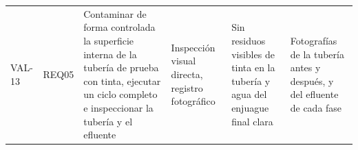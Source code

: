 \begin{longtable}{p{1.3cm} p{1.4cm} p{4.3cm} p{2.6cm} p{3.4cm} p{2.4cm}}
VAL-13 & REQ05 & Contaminar de forma controlada la superficie interna de la tubería de prueba con tinta, ejecutar un ciclo completo e inspeccionar la tubería y el efluente & Inspección visual directa, registro fotográfico & Sin residuos visibles de tinta en la tubería y agua del enjuague final clara & Fotografías de la tubería antes y después, y del efluente de cada fase \\

\end{longtable}